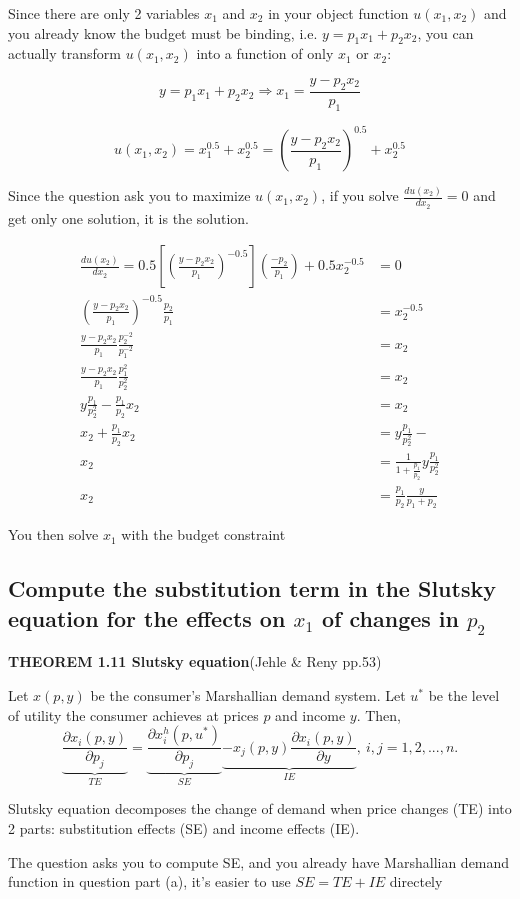 \documentclass{article}
\begin{document}
\begin{mdframed}[backgroundcolor=blue!20,linecolor=white]
Since there are only 2 variables $x_1$ and $x_2$ in your object function
$u(x_1,x_2)$ and you already know the budget must be binding, i.e.
$y = p_1x_1 + p_2x_2$, you can actually transform $u(x_1,x_2)$  into 
a function of only $x_1$ or $x_2$:

$$y = p_1x_1 + p_2x_2 \Rightarrow x_1 = \frac{y-p_2x_2}{p_1}$$

$$u(x_1,x_2)= x_1^{0.5} + x_2^{0.5} = (\frac{y-p_2x_2}{p_1})^{0.5} + x_2^{0.5}$$

Since the question ask you to maximize $u(x_1,x_2)$, if you solve $\frac{d u(x_2)}{d x_2} = 0$ and get only one solution, it is the solution.


\begin{align*}
\frac{d u(x_2)}{d x_2} = 0.5[ (\frac{y-p_2x_2}{p_1})^{-0.5}](\frac{-p_2}{p_1}) + 0.5x_2^{-0.5} &= 0 \\
(\frac{y-p_2x_2}{p_1})^{-0.5}\frac{p_2}{p_1} &= x_2^{-0.5} \\
\frac{y-p_2x_2}{p_1}\frac{p_2^{-2}}{p_1^{-2}} &= x_2 \\
\frac{y-p_2x_2}{p_1}\frac{p_1^{2}}{p_2^{2}} &= x_2 \\
y\frac{p_1}{p_2^{2}} - \frac{p_1}{p_2}x_2&= x_2 \\
x_2 + \frac{p_1}{p_2}x_2 &=  y\frac{p_1}{p_2^{2}} -\\
x_2 &=  \frac{1}{1+\frac{p_1}{p_2}}y\frac{p_1}{p_2^{2}} \\
x_2 &=  \frac{p_1}{p_2}\frac{y}{p_1 + p_2}
\end{align*}

You then solve $x_1$ with the budget constraint
\end{mdframed}


\subsection{Compute the substitution term in the Slutsky equation for the effects on $x_1$ of changes in $p_2$}

\begin{mdframed}[backgroundcolor=blue!20,linecolor=white]
\textbf{THEOREM 1.11 Slutsky equation}(Jehle \& Reny pp.53)

Let $x(p, y)$ be the consumer’s Marshallian demand system. Let $u^*$ be the level of utility the consumer achieves at prices $p$ and income $y$. Then,
$$\underbrace{\frac{\partial x_i(p,y)}{\partial p_j}}_{TE} = \underbrace{\frac{\partial x_i^h(p,u^*)}{\partial p_j}}_{SE} \underbrace{- x_j(p,y)\frac{\partial x_i(p,y)}{\partial y}}_{IE} , \  i,j = 1,2,...,n.$$

Slutsky equation decomposes the change of demand when price changes (TE) into
2 parts: substitution effects (SE) and income effects (IE).

The question asks you to compute SE, and you already have Marshallian demand function in question part (a), it's easier to use $SE = TE + IE$ directely

\end{mdframed}
\end{document}
